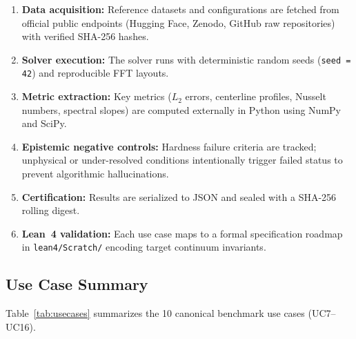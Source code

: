 \begin{enumerate}
  \item \textbf{Data acquisition:} Reference datasets and configurations are fetched from official public endpoints (Hugging Face, Zenodo, GitHub raw repositories) with verified SHA-256 hashes.
  \item \textbf{Solver execution:} The solver runs with deterministic random seeds (\texttt{seed = 42}) and reproducible FFT layouts.
  \item \textbf{Metric extraction:} Key metrics ($L_2$ errors, centerline profiles, Nusselt numbers, spectral slopes) are computed externally in Python using NumPy and SciPy.
  \item \textbf{Epistemic negative controls:} Hardness failure criteria are tracked; unphysical or under-resolved conditions intentionally trigger failed status to prevent algorithmic hallucinations.
  \item \textbf{Certification:} Results are serialized to JSON and sealed with a SHA-256 rolling digest.
  \item \textbf{Lean~4 validation:} Each use case maps to a formal specification roadmap in \texttt{lean4/Scratch/} encoding target continuum invariants.
\end{enumerate}

\subsection{Use Case Summary}

Table~\ref{tab:usecases} summarizes the 10 canonical benchmark use cases (UC7--UC16).

